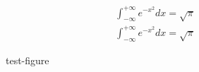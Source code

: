 \documentclass[../main.tex]{subfiles}
\begin{document}
\begin{align*}
\int_{-\infty}^{+\infty} e^{-x^{2}} dx = \sqrt{\pi} 
\end{align*}
\begin{align*}
\int_{-\infty}^{+\infty} e^{-x^{2}} dx = \sqrt{\pi} 
\end{align*}
\begin{figure}[ht]
    \centering
    \caption{test-figure}
    \label{fig:test-figure}
\end{figure}
\end{document}
